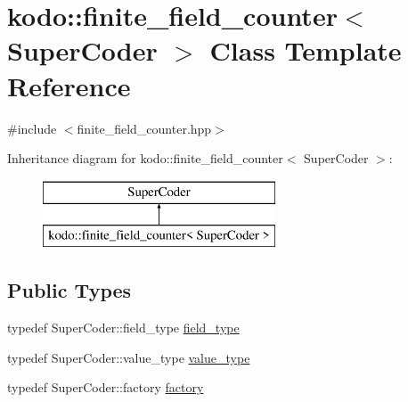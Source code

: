 \hypertarget{classkodo_1_1finite__field__counter}{\section{kodo\-:\-:finite\-\_\-field\-\_\-counter$<$ Super\-Coder $>$ Class Template Reference}
\label{classkodo_1_1finite__field__counter}
}


{\ttfamily \#include $<$finite\-\_\-field\-\_\-counter.\-hpp$>$}

Inheritance diagram for kodo\-:\-:finite\-\_\-field\-\_\-counter$<$ Super\-Coder $>$\-:\begin{figure}[H]
\begin{center}
\leavevmode
\includegraphics[height=2.000000cm]{classkodo_1_1finite__field__counter}
\end{center}
\end{figure}
\subsection*{Public Types}
\begin{DoxyCompactItemize}
\item 
typedef Super\-Coder\-::field\-\_\-type \hyperlink{classkodo_1_1finite__field__counter_ad7c95704b9f98e4196759c95dde832a7}{field\-\_\-type}
\begin{DoxyCompactList}\small\item\em \end{DoxyCompactList}\item 
typedef Super\-Coder\-::value\-\_\-type \hyperlink{classkodo_1_1finite__field__counter_a155bca81853a6feeed7e98a3207bbfe6}{value\-\_\-type}
\begin{DoxyCompactList}\small\item\em \end{DoxyCompactList}\item 
typedef Super\-Coder\-::factory \hyperlink{classkodo_1_1finite__field__counter_afbbc7697ff30ee6b96b67c311c5975d7}{factory}
\begin{DoxyCompactList}\small\item\em \end{DoxyCompactList}\end{DoxyCompactItemize}
